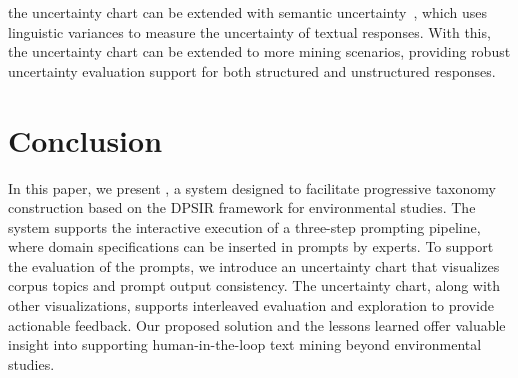the uncertainty chart can be extended with semantic uncertainty~\cite{kuhn2023semanticuncertainty, cheng2024relic}, which uses linguistic variances to measure the uncertainty of textual responses. 
With this, the uncertainty chart can be extended to more mining scenarios, providing robust uncertainty evaluation support for both structured and unstructured responses.


\section{Conclusion}
In this paper, we present \system, a system designed to facilitate progressive taxonomy construction based on the DPSIR framework for environmental studies. The system supports the interactive execution of a three-step prompting pipeline, where domain specifications can be inserted in prompts by experts. To support the evaluation of the prompts, we introduce an uncertainty chart that visualizes corpus topics and prompt output consistency. The uncertainty chart, along with other visualizations, supports interleaved evaluation and exploration to provide actionable feedback. Our proposed solution and the lessons learned offer valuable insight into supporting human-in-the-loop text mining beyond environmental studies.
